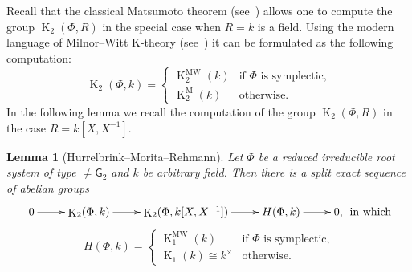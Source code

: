 \documentclass[oneside, 8pt]{amsart}
\newtheorem{lemma}{Lemma}
\theoremstyle{remark}
\theoremstyle{definition}
\numberwithin{lemma}{section}
\numberwithin{prop}{section}
\numberwithin{corollary}{section}
\numberwithin{externaltheorem}{section}
\DeclareMathOperator{\K}{K}
\newcommand{\inv}{^{-1}}
\newcommand{\rG}{\mathsf{G}}
\numberwithin{equation}{section}
\begin{document}
Recall that the classical Matsumoto theorem (see~\cite[Theorem~5.10]{Ma69}) allows one to compute the group $\K_2(\Phi, R)$ in the special case when $R=k$ is a field.
Using the modern language of Milnor--Witt K-theory (see~\cite{Mo04}) it can be formulated as the following computation:
\[\K_2(\Phi, k) = \left\{\begin{array}{ll} \K_2^\mathrm{MW}(k)& \text{if $\Phi$ is symplectic,}\\ \K_2^\mathrm{M}(k) & \text{otherwise.}\end{array}\right. \]
In the following lemma we recall the computation of the group $\K_2(\Phi, R)$ in the case $R=k[X, X\inv]$.
\begin{lemma}[Hurrelbrink--Morita--Rehmann]\label{K2-laurent-field} Let $\Phi$ be a reduced irreducible root system of type $\neq \rG_2$ and $k$ be arbitrary field. Then there is a split exact sequence of abelian groups
\[ \xymatrix{ 0 \ar[r] & \K_2(\Phi, k) \ar[r] & \K_2(\Phi, k[X, X^{-1}]) \ar[r] & H(\Phi, k) \ar[r] & 0,}\text{ in which} \]
\[ H(\Phi, k) = \left\{\begin{array}{ll} \K_1^\mathrm{MW}(k)& \text{if $\Phi$ is symplectic,}\\ \K_1(k) \cong k^\times & \text{otherwise.}  \end{array}\right. \]  \end{lemma}
\end{document}
